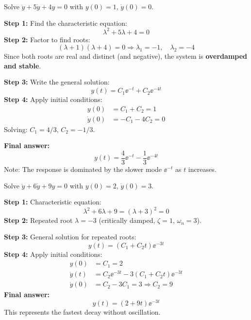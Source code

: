 \begin{examplebox}[title=Example: Overdamped Second-Order System]
Solve $\ddot{y} + 5\dot{y} + 4y = 0$ with $y(0) = 1$, $\dot{y}(0) = 0$.

\textbf{Step 1:} Find the characteristic equation:
\begin{equation}
\lambda^2 + 5\lambda + 4 = 0
\end{equation}
\textbf{Step 2:} Factor to find roots:
\begin{equation}
(\lambda + 1)(\lambda + 4) = 0 \Rightarrow \lambda_1 = -1, \quad \lambda_2 = -4
\end{equation}
Since both roots are real and distinct (and negative), the system is \textbf{overdamped and stable}.

\textbf{Step 3:} Write the general solution:
\begin{equation}
y(t) = C_1 \ee^{-t} + C_2 \ee^{-4t}
\end{equation}
\textbf{Step 4:} Apply initial conditions:
\begin{align}
y(0) &= C_1 + C_2 = 1 \\
\dot{y}(0) &= -C_1 - 4C_2 = 0
\end{align}
Solving: $C_1 = 4/3$, $C_2 = -1/3$.

\textbf{Final answer:}
\begin{equation}
y(t) = \frac{4}{3}\ee^{-t} - \frac{1}{3}\ee^{-4t}
\end{equation}
Note: The response is dominated by the slower mode $\ee^{-t}$ as $t$ increases.
\end{examplebox}

\begin{examplebox}[title=Example: Critically Damped System]
Solve $\ddot{y} + 6\dot{y} + 9y = 0$ with $y(0) = 2$, $\dot{y}(0) = 3$.

\textbf{Step 1:} Characteristic equation:
\begin{equation}
\lambda^2 + 6\lambda + 9 = (\lambda + 3)^2 = 0
\end{equation}
\textbf{Step 2:} Repeated root $\lambda = -3$ (critically damped, $\zeta = 1$, $\omega_n = 3$).

\textbf{Step 3:} General solution for repeated roots:
\begin{equation}
y(t) = (C_1 + C_2 t)\ee^{-3t}
\end{equation}
\textbf{Step 4:} Apply initial conditions:
\begin{align}
y(0) &= C_1 = 2 \\
\dot{y}(t) &= C_2\ee^{-3t} - 3(C_1 + C_2 t)\ee^{-3t} \\
\dot{y}(0) &= C_2 - 3C_1 = 3 \Rightarrow C_2 = 9
\end{align}
\textbf{Final answer:}
\begin{equation}
y(t) = (2 + 9t)\ee^{-3t}
\end{equation}
This represents the fastest decay without oscillation.
\end{examplebox}

